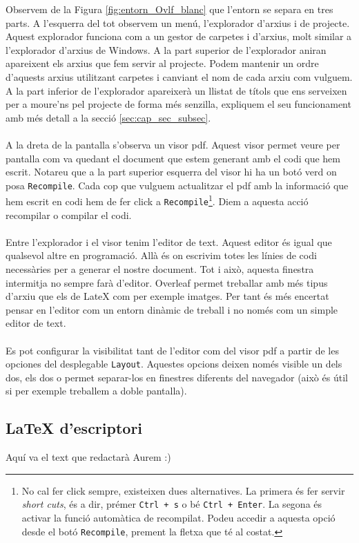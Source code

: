 \documentclass[12pm,twosides,onecolumn,openany]{book}
\newcounter{exemple}[chapter]
\begin{document}
\noindent Observem de la Figura \ref{fig:entorn_Ovlf_blanc} que l'entorn se separa en tres parts. A l'esquerra del tot observem un menú, l'explorador d'arxius i de projecte. Aquest explorador funciona com a un gestor de carpetes i d'arxius, molt similar a l'explorador d'arxius de Windows. A la part superior de l'explorador aniran apareixent els arxius que fem servir al projecte. Podem mantenir un ordre d'aquests arxius utilitzant carpetes i canviant el nom de cada arxiu com vulguem. A la part inferior de l'explorador apareixerà un llistat de títols que ens serveixen per a moure'ns pel projecte de forma més senzilla, expliquem el seu funcionament amb més detall a la secció \ref{sec:cap_sec_subsec}.\\\\
A la dreta de la pantalla s'observa un visor pdf. Aquest visor permet veure per pantalla com va quedant el document que estem generant amb el codi que hem escrit. Notareu que a la part superior esquerra del visor hi ha un botó verd on posa \texttt{Recompile}. Cada cop que vulguem actualitzar el pdf amb la informació que hem escrit en codi hem de fer click a \texttt{Recompile}\footnote{No cal fer click sempre, existeixen dues alternatives. La primera és fer servir \textit{short cuts}, és a dir, prémer \texttt{Ctrl + s} o bé \texttt{Ctrl + Enter}. La segona és activar la funció automàtica de recompilat. Podeu accedir a aquesta opció desde el botó \texttt{Recompile}, prement la fletxa que té al costat.}. Diem a aquesta acció recompilar o compilar el codi.\\\\
Entre l'explorador i el visor tenim l'editor de text. Aquest editor és igual que qualsevol altre en programació. Allà és on escrivim totes les línies de codi necessàries per a generar el nostre document. Tot i això, aquesta finestra intermitja no sempre farà d'editor. Overleaf permet treballar amb més tipus d'arxiu que els de LateX com per exemple imatges. Per tant és més encertat pensar en l'editor com un entorn dinàmic de treball i no només com un simple editor de text.\\\\
Es pot configurar la visibilitat tant de l'editor com del visor pdf a partir de les opciones del desplegable \texttt{Layout}. Aquestes opcions deixen només visible un dels dos, els dos o permet separar-los en finestres diferents del navegador (això és útil si per exemple treballem a doble pantalla).
\subsection{LaTeX d'escriptori}
Aquí va el text que redactarà Aurem :)
\end{document}
